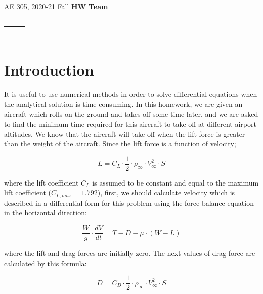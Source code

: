 \documentclass[letterpaper,12pt]{article}
\begin{document}
\begin{center}
AE 305, 2020-21 Fall \hfill \textbf{HW \HWno} \hfill \textbf{Team \TeamNo} \\
\noindent\rule{\textwidth}{0.4pt}
\begin{tabular}{p{} | p{} | p{} }
	\AuthorOneName&\AuthorTwoName&\AuthorThreeName\\
	\textit{\AuthorOneID}&\textit{\AuthorTwoID}&\textit{\AuthorThreeID}
\end{tabular}
\noindent\rule{\textwidth}{0.4pt}
\end{center}


\section{Introduction}

It is useful to use numerical methods in order to solve differential equations when
the analytical solution is time-consuming. In this homework, we are given an aircraft
which rolls on the ground and takes off some time later, and we are asked to find
the minimum time required for this aircraft to take off at different airport altitudes.
We know that the aircraft will take off when the lift force is greater than the weight of
the aircraft. Since the lift force is a function of velocity;

\begin{equation}
        L = C_L \cdot \frac{1}{2} \cdot \rho_{\infty} \cdot V_{\infty}^{2} \cdot S
\end{equation}

where the lift coefficient $C_L$ is assumed to be constant and equal to the maximum lift coefficient
($C_{L,max} = 1.792$), first, we should calculate velocity which is described in a differential form for
this problem using the force balance equation in the horizontal direction:

\begin{equation}
        \frac{W}{g} \cdot \frac{dV}{dt} = T - D - \mu \cdot (W - L)
\end{equation}

where the lift and drag forces are initially zero. The next values of drag force are calculated
by this formula:

\begin{equation}
        D = C_D \cdot \frac{1}{2} \cdot \rho_{\infty} \cdot V_{\infty}^{2} \cdot S
\end{equation}
\end{document}
